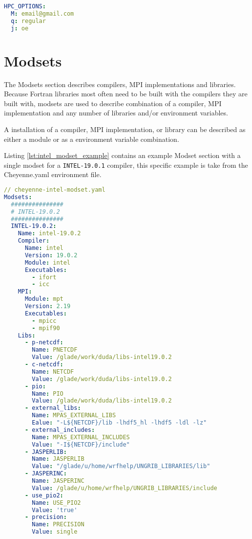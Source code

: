 \begin{lstlisting}[language=yaml, 
                   caption={Examlpe HPC\_Options},
                   label={lst:hpc_options}]
HPC_OPTIONS:
  M: email@gmail.com 
  q: regular
  j: oe
\end{lstlisting}


\section{Modsets}
\label{sec:modsets}

The Modsets section describes compilers, MPI implementations and libraries.
Because Fortran libraries most often need to be built with the compilers they
are built with, modsets are used to describe combination of a compiler, MPI
implementation and any number of libraries and/or environment variables.

A installation of a compiler, MPI implementation, or library can be described
as either a module or as a environment variable combination. 

Listing \ref{lst:intel_modset_example} contains an example Modset section with
a single modset for a {\tt INTEL-19.0.1} compiler, this specific example is
take from the Cheyenne.yaml environment file.

\begin{lstlisting}[language=yaml, 
                   caption={Example Cheyenne Intel Modset},
                   label={lst:intel_modset_example}]
// cheyenne-intel-modset.yaml
Modsets:
  ###############
  # INTEL-19.0.2
  ###############
  INTEL-19.0.2:
    Name: intel-19.0.2
    Compiler:
      Name: intel
      Version: 19.0.2
      Module: intel
      Executables:
        - ifort
        - icc
    MPI:
      Module: mpt
      Version: 2.19
      Executables:
        - mpicc
        - mpif90
    Libs:
      - p-netcdf:
        Name: PNETCDF
        Value: /glade/work/duda/libs-intel19.0.2
      - c-netcdf:
        Name: NETCDF
        Value: /glade/work/duda/libs-intel19.0.2
      - pio:
        Name: PIO
        Value: /glade/work/duda/libs-intel19.0.2
      - external_libs:
        Name: MPAS_EXTERNAL_LIBS
        Ealue: "-L${NETCDF}/lib -lhdf5_hl -lhdf5 -ldl -lz"
      - external_includes:
        Name: MPAS_EXTERNAL_INCLUDES
        Value: "-I${NETCDF}/include"
      - JASPERLIB:
        Name: JASPERLIB
        Value: "/glade/u/home/wrfhelp/UNGRIB_LIBRARIES/lib"
      - JASPERINC:
        Name: JASPERINC
        Value: /glade/u/home/wrfhelp/UNGRIB_LIBRARIES/include
      - use_pio2:
        Name: USE_PIO2
        Value: 'true'
      - precision:
        Name: PRECISION
        Value: single
\end{lstlisting}


